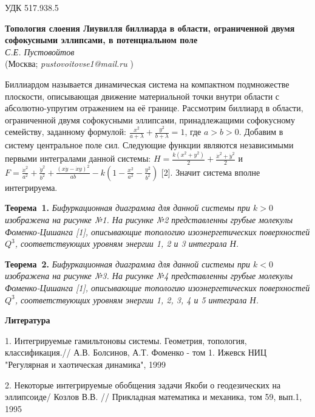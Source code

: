 
\small УДК 517.938.5

\begin{center}{ \bf  Топология слоения Лиувилля биллиарда в области, ограниченной двумя софокусными эллипсами, в потенциальном поле}\\
{\it С.Е. Пустовойтов } \\
(Москва; {\it pustovoitovse1@mail.ru} )
\end{center}


Биллиардом называется динамическая система на компактном подмножестве плоскости, описывающая  движение материальной точки внутри области  с абсолютно-упругим отражением на её границе. Рассмотрим биллиард в области, ограниченной двумя софокусными эллипсами, принадлежащими софокусному семейству, заданному формулой: $\frac{x^2}{a+\lambda}+\frac{y
^2}{b+\lambda}=1$, где $a>b>0$. Добавим в систему центральное поле сил. Следующие функции являются независимыми первыми интегралами данной системы: $H=\frac{k(x^2+y^2)}{2}+\frac{\dot{x}^2+\dot{y}^2}{2}$ и $F=\frac{\dot{x}^2}{a^2}+\frac{\dot{y}^2}{b^2}+\frac{(x\dot{y}-\dot{x}y)^2}{ab}-k(1-\frac{x^2}{a^2}-\frac{y^2}{b^2})$ [2]. Значит система вполне интегрируема.

\textbf{Теорема~1.} {\it Бифуркационная диаграмма для данной системы при $k>0$ изображена на рисунке №1. На рисунке №2 представленны грубые молекулы Фоменко-Цишанга [1], описывающие топологию изоэнергетических поверхностей $Q^3$, соответствующих уровням энергии 1, 2 и 3 интеграла Н.
}

\textbf{Теорема~2.} {\it Бифуркационная диаграмма для данной системы при $k<0$ изображена на рисунке №3. На рисунке №4 представленны грубые молекулы Фоменко-Цишанга [1], описывающие топологию изоэнергетических поверхностей $Q^3$, соответствующих уровням энергии 1, 2, 3, 4 и 5 интеграла Н.
}

\smallskip \centerline{\bf Литература}\nopagebreak

1. Интегрируемые гамильтоновы системы. Геометрия, топология, классификация.// 	А.В. Болсинов, А.Т. Фоменко - том 1. Ижевск НИЦ	"Регулярная и хаотическая динамика", 1999

2. Некоторые интегрируемые обобщения задачи Якоби о геодезических на эллипсоиде/  Козлов В.В. // Прикладная математика и механика, том 59, вып.1, 1995

